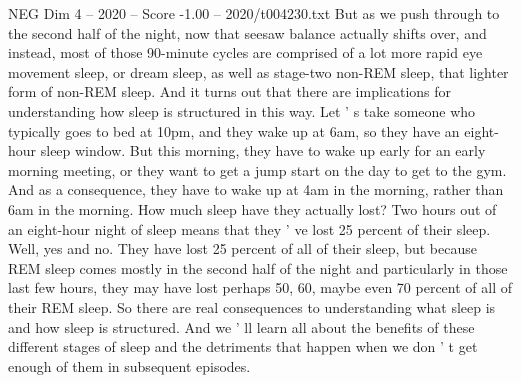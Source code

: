 \begin{textsample}{NEG Dim 4 – 2020 – Score -1.00 – 2020/t004230.txt}
But as we push through to the second half of the night, now that seesaw balance actually shifts over, and instead, most of those 90-minute cycles are comprised of a lot more rapid eye movement sleep, or dream sleep, as well as stage-two non-REM sleep, that lighter form of non-REM sleep.
And it turns out that there are implications for understanding how sleep is structured in this way.
Let ' s take someone who typically goes to bed at 10pm, and they wake up at 6am, so they have an eight-hour sleep window.
But this morning, they have to wake up early for an early morning meeting, or they want to get a jump start on the day to get to the gym.
And as a consequence, they have to wake up at 4am in the morning, rather than 6am in the morning.
How much sleep have they actually lost?
Two hours out of an eight-hour night of sleep means that they ' ve lost 25 percent of their sleep.
Well, yes and no.
They have lost 25 percent of all of their sleep, but because REM sleep comes mostly in the second half of the night and particularly in those last few hours, they may have lost perhaps 50, 60, maybe even 70 percent of all of their REM sleep.
So there are real consequences to understanding what sleep is and how sleep is structured.
And we ' ll learn all about the benefits of these different stages of sleep and the detriments that happen when we don ' t get enough of them in subsequent episodes.

\end{textsample}
